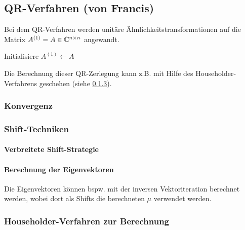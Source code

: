 
			\subsection{QR-Verfahren (von Francis)}
				Bei dem QR-Verfahren werden unitäre Ähnlichkeitstransformationen auf die Matrix \( A^{(1)} = A \in \mathbb{C}^{n \times n} \) angewandt.

				\begin{algorithm}[H]
					Initialisiere \( A^{(1)} \gets A \)

				\end{algorithm}

				Die Berechnung dieser QR-Zerlegung kann z.B. mit Hilfe des Householder-Verfahrens geschehen (siehe \ref{sec:householder}).

				\subsubsection{Konvergenz}

				\subsubsection{Shift-Techniken}

				\paragraph{Verbreitete Shift-Strategie}

				\paragraph{Berechnung der Eigenvektoren}
					Die Eigenvektoren können bspw. mit der inversen Vektoriteration berechnet werden, wobei dort als Shifts die berechneten \(\mu\) verwendet werden.

			\subsubsection{Householder-Verfahren zur Berechnung}
				\label{sec:householder}

